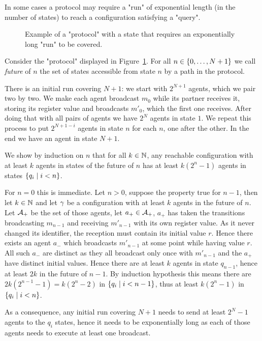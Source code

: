 \begin{ex}
	In some cases a protocol may require a "run" of exponential length (in the number of states) to reach a configuration satisfying a "query".
	
	\begin{figure}[h]
		
		\label{fig:exp-run}
		\caption{Example of a "protocol" with a state that requires an exponentially long "run" to be covered.}
	\end{figure}

	Consider the "protocol" displayed in Figure~\ref{fig:exp-run}. 
	For all $n \in \{0, \ldots, N+1\}$ we call \emph{future} of $n$ the set of states accessible from state $n$ by a path in the protocol.
	
	There is an initial run covering $N+1$: we start with $2^{N+1}$ agents, which we pair two by two. We make each agent broadcast $m_0$ while its partner receives it, storing its register value and broadcasts $m'_0$, which the first one receives. After doing that with all pairs of agents we have $2^{N}$ agents in state $1$.
	We repeat this process to put $2^{N+1-i}$ agents in state $n$ for each $n$, one after the other. In the end we have an agent in state $N+1$.
	
	We show by induction on $n$ that for all $k \in \mathbb{N}$, any reachable configuration with at least $k$ agents in states of the future of $n$ has at least $k(2^n-1)$ agents in states $\{q_i \mid i<n\}$.
	
	For $n=0$ this is immediate. Let $n>0$, suppose the property true for $n-1$, then let $k \in \mathbb{N}$ and let $\gamma$ be a configuration with at least $k$ agents in the future of $n$. Let $\mathcal{A}_+$ be the set of those agents, let $a_+ \in \mathcal{A}_+$, $a_+$ has taken the transitions broadcasting $m_{n-1}$ and receiving $m'_{n-1}$ with its own register value. As it never changed its identifier, the reception must contain its initial value $r$. Hence there exists an agent $a_-$ which broadcasts $m'_{n-1}$ at some point while having value $r$. All such $a_-$ are distinct as they all broadcast only once with $m'_{n-1}$ and the $a_+$ have distinct initial values.
	Hence there are at least $k$ agents in state $q_{n-1}$, hence at least $2k$ in the future of $n-1$. By induction hypothesis this means there are $2k(2^{n-1}-1) = k(2^n-2)$ in $\{q_i \mid i<n-1\}$, thus at least $k(2^n-1)$ in $\{q_i \mid i<n\}$.
	
	As a consequence, any initial run covering $N+1$ needs to send at least $2^N-1$ agents to the $q_i$ states, hence it needs to be exponentially long as each of those agents needs to execute at least one broadcast.
\end{ex}

